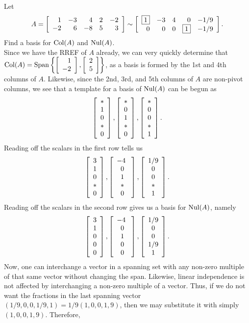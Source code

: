\begin{Exam} Let \[A = \mtx{rrrrr}{1&-3&4&2&-2\\-2&6&-8&5&3} \sim \mtx{rrrrr}{\fbox{$1$}&-3&4&0&-1/9\\0&0&0&\fbox{$1$}&-1/9}.\] Find a basis for $\col(A)$ and $\nul(A)$.\\

Since we have the RREF of $A$ already, we can very quickly determine that $\col(A) = \Span\left\{\vr{1\\-2}, \vr{2\\5}\right\}$, as a basis is formed by the 1st and 4th columns of $A$. Likewise, since the 2nd, 3rd, and 5th columns of $A$ are non-pivot columns, we see that a template for a basis of $\nul(A)$ can be begun as
\[\vr{\ast\\1\\0\\\ast\\0}, \vr{\ast\\0\\1\\\ast\\0}, \vr{\ast\\0\\0\\\ast\\1}.\] Reading off the scalars in the first row tells us 
\[\vr{3\\1\\0\\\ast\\0}, \mtx{c}{-4\ \\0\\1\\\ast\\0}, \mtx{c}{1/9\\0\\0\\\ast\\1}.\] Reading off the scalars in the second row gives us a basis for $\nul(A)$, namely 
\[\vr{3\\1\\0\\0\\0}, \mtx{c}{-4\ \\0\\1\\0\\0}, \mtx{c}{1/9\\0\\0\\1/9\\1}.\] Now, one can interchange a vector in a spanning set with any non-zero multiple of that same vector without changing the span. Likewise, linear independence is not affected by interchanging a non-zero multiple of a vector. Thus, if we do not want the fractions in the last spanning vector $(1/9, 0, 0, 1/9, 1) = 1/9(1,0,0,1,9)$, then we may substitute it with simply $(1,0,0,1,9)$. Therefore,

\end{Exam}
